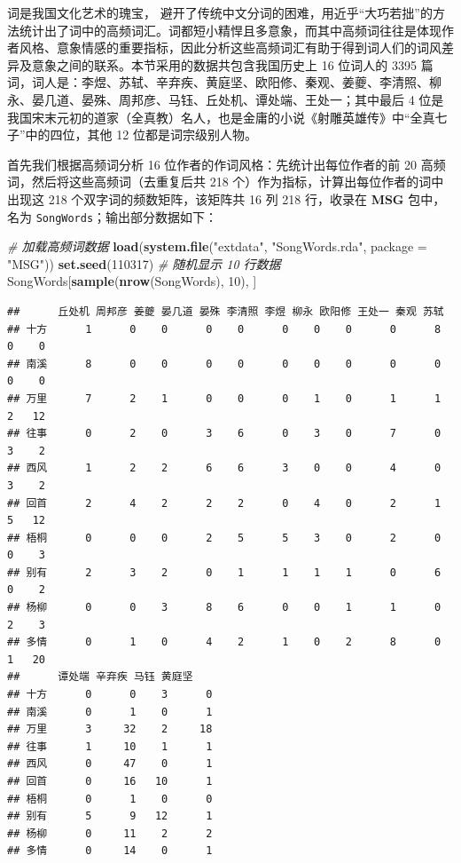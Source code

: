 \documentclass[
  b5paper,
  UTF8,twoside]{book}
\newenvironment{Shaded}{\begin{snugshade}}{\end{snugshade}}
\newcommand{\AttributeTok}[1]{\textcolor[rgb]{0.13,0.29,0.53}{#1}}
\newcommand{\CommentTok}[1]{\textcolor[rgb]{0.56,0.35,0.01}{\textit{#1}}}
\newcommand{\DecValTok}[1]{\textcolor[rgb]{0.00,0.00,0.81}{#1}}
\newcommand{\FunctionTok}[1]{\textcolor[rgb]{0.13,0.29,0.53}{\textbf{#1}}}
\newcommand{\NormalTok}[1]{#1}
\newcommand{\StringTok}[1]{\textcolor[rgb]{0.31,0.60,0.02}{#1}}
\begin{document}
词是我国文化艺术的瑰宝， \citet{Qiu11} 避开了传统中文分词的困难，用近乎``大巧若拙''的方法统计出了词中的高频词汇。词都短小精悍且多意象，而其中高频词往往是体现作者风格、意象情感的重要指标，因此分析这些高频词汇有助于得到词人们的词风差异及意象之间的联系。本节采用的数据共包含我国历史上 16 位词人的 3395 篇词，词人是：李煜、苏轼、辛弃疾、黄庭坚、欧阳修、秦观、姜夔、李清照、柳永、晏几道、晏殊、周邦彦、马钰、丘处机、谭处端、王处一；其中最后 4 位是我国宋末元初的道家（全真教）名人，也是金庸的小说《射雕英雄传》中``全真七子''中的四位，其他 12 位都是词宗级别人物。

首先我们根据高频词分析 16 位作者的作词风格：先统计出每位作者的前 20 高频词，然后将这些高频词（去重复后共 218 个）作为指标，计算出每位作者的词中出现这 218 个双字词的频数矩阵，该矩阵共 16 列 218 行，收录在 \textbf{MSG} 包中，名为 \texttt{SongWords}；输出部分数据如下：

\begin{Shaded}
\begin{Highlighting}[]
\CommentTok{\# 加载高频词数据}
\FunctionTok{load}\NormalTok{(}\FunctionTok{system.file}\NormalTok{(}\StringTok{"extdata"}\NormalTok{, }\StringTok{"SongWords.rda"}\NormalTok{, }\AttributeTok{package =} \StringTok{"MSG"}\NormalTok{))}
\FunctionTok{set.seed}\NormalTok{(}\DecValTok{110317}\NormalTok{) }\CommentTok{\# 随机显示 10 行数据}
\NormalTok{SongWords[}\FunctionTok{sample}\NormalTok{(}\FunctionTok{nrow}\NormalTok{(SongWords), }\DecValTok{10}\NormalTok{), ]}
\end{Highlighting}
\end{Shaded}

\begin{verbatim}
##      丘处机 周邦彦 姜夔 晏几道 晏殊 李清照 李煜 柳永 欧阳修 王处一 秦观 苏轼
## 十方      1      0    0      0    0      0    0    0      0      8    0    0
## 南溪      8      0    0      0    0      0    0    0      0      0    0    0
## 万里      7      2    1      0    0      0    1    0      1      1    2   12
## 往事      0      2    0      3    6      0    3    0      7      0    3    2
## 西风      1      2    2      6    6      3    0    0      4      0    3    2
## 回首      2      4    2      2    2      0    4    0      2      1    5   12
## 梧桐      0      0    0      2    5      5    3    0      2      0    0    3
## 别有      2      3    2      0    1      1    1    1      0      6    0    2
## 杨柳      0      0    3      8    6      0    0    1      1      0    2    3
## 多情      0      1    0      4    2      1    0    2      8      0    1   20
##      谭处端 辛弃疾 马钰 黄庭坚
## 十方      0      0    3      0
## 南溪      0      1    0      1
## 万里      3     32    2     18
## 往事      1     10    1      1
## 西风      0     47    0      1
## 回首      0     16   10      1
## 梧桐      0      1    0      0
## 别有      5      9   12      1
## 杨柳      0     11    2      2
## 多情      0     14    0      1
\end{verbatim}
\end{document}
